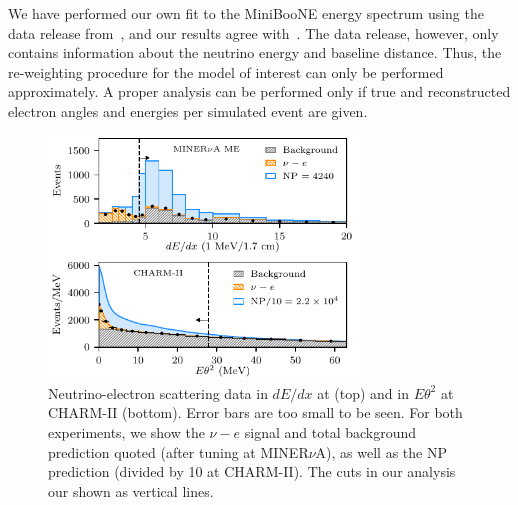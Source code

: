 We have performed our own fit to the MiniBooNE energy spectrum using the data release from~\cite{Aguilar-Arevalo:2018gpe}, and our results agree with~\cite{Bertuzzo:2018itn}. The data release, however, only contains information about the neutrino energy and baseline distance. Thus, the re-weighting procedure for the model of interest can only be performed approximately. A proper analysis can be performed only if true and reconstructed electron angles and energies per simulated event are given.  
%
\begin{figure}[t!]
    \centering
    \includegraphics[width=0.75\textwidth]{both_cartoon.pdf}
    \caption[New physics signal in neutrino-electron scattering data.]{Neutrino-electron scattering data in $dE/dx$ at \minerva (top) and in $E\theta^2$ at CHARM-II (bottom). Error bars are too small to be seen. For both experiments, we show the $\nu-e$ signal and total background prediction quoted (after tuning at MINER$\nu$A), as well as the NP prediction (divided by 10 at CHARM-II). The cuts in our analysis our shown as vertical lines. \label{fig:NP_events}}
\end{figure}



